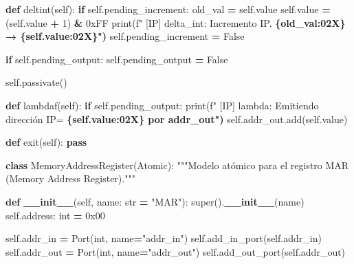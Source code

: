 \documentclass[12pt,oneside]{templates/unerthesis}
\newenvironment{Shaded}{\begin{snugshade}}{\end{snugshade}}
\newcommand{\BaseNTok}[1]{\textcolor[rgb]{0.00,0.00,0.81}{#1}}
\newcommand{\BuiltInTok}[1]{#1}
\newcommand{\ControlFlowTok}[1]{\textcolor[rgb]{0.13,0.29,0.53}{\textbf{#1}}}
\newcommand{\DecValTok}[1]{\textcolor[rgb]{0.00,0.00,0.81}{#1}}
\newcommand{\ErrorTok}[1]{\textcolor[rgb]{0.64,0.00,0.00}{\textbf{#1}}}
\newcommand{\FunctionTok}[1]{\textcolor[rgb]{0.13,0.29,0.53}{\textbf{#1}}}
\newcommand{\KeywordTok}[1]{\textcolor[rgb]{0.13,0.29,0.53}{\textbf{#1}}}
\newcommand{\NormalTok}[1]{#1}
\newcommand{\OperatorTok}[1]{\textcolor[rgb]{0.81,0.36,0.00}{\textbf{#1}}}
\newcommand{\SpecialStringTok}[1]{\textcolor[rgb]{0.31,0.60,0.02}{#1}}
\newcommand{\StringTok}[1]{\textcolor[rgb]{0.31,0.60,0.02}{#1}}
\newcommand{\VariableTok}[1]{\textcolor[rgb]{0.00,0.00,0.00}{#1}}
\begin{document}
\begin{Shaded}
\begin{Highlighting}[]
    \KeywordTok{def}\NormalTok{ deltint(}\VariableTok{self}\NormalTok{):}
        \ControlFlowTok{if} \VariableTok{self}\NormalTok{.pending\_increment:}
\NormalTok{            old\_val }\OperatorTok{=} \VariableTok{self}\NormalTok{.value}
            \VariableTok{self}\NormalTok{.value }\OperatorTok{=}\NormalTok{ (}\VariableTok{self}\NormalTok{.value }\OperatorTok{+} \DecValTok{1}\NormalTok{) }\OperatorTok{\&} \BaseNTok{0xFF}
            \BuiltInTok{print}\NormalTok{(}\SpecialStringTok{f"  [IP] delta\_int: Incremento IP.}
\ErrorTok{            \{old\_val:02X\} → \{self.value:02X\}")}
            \VariableTok{self}\NormalTok{.pending\_increment }\OperatorTok{=} \VariableTok{False}
        
        \ControlFlowTok{if} \VariableTok{self}\NormalTok{.pending\_output:}
            \VariableTok{self}\NormalTok{.pending\_output }\OperatorTok{=} \VariableTok{False}
        
        \VariableTok{self}\NormalTok{.passivate()}
    
    \KeywordTok{def}\NormalTok{ lambdaf(}\VariableTok{self}\NormalTok{):}
        \ControlFlowTok{if} \VariableTok{self}\NormalTok{.pending\_output:}
            \BuiltInTok{print}\NormalTok{(}\SpecialStringTok{f"  [IP] lambda: Emitiendo dirección IP=}
\ErrorTok{            \{self.value:02X\} por addr\_out")}
            \VariableTok{self}\NormalTok{.addr\_out.add(}\VariableTok{self}\NormalTok{.value)}
    
    \KeywordTok{def}\NormalTok{ exit(}\VariableTok{self}\NormalTok{):}
        \ControlFlowTok{pass}


\KeywordTok{class}\NormalTok{ MemoryAddressRegister(Atomic):}
    \StringTok{"""Modelo atómico para el registro MAR }
\StringTok{    (Memory Address Register)."""}
    
    \KeywordTok{def} \FunctionTok{\_\_init\_\_}\NormalTok{(}\VariableTok{self}\NormalTok{, name: }\BuiltInTok{str} \OperatorTok{=} \StringTok{"MAR"}\NormalTok{):}
        \BuiltInTok{super}\NormalTok{().}\FunctionTok{\_\_init\_\_}\NormalTok{(name)}
        \VariableTok{self}\NormalTok{.address: }\BuiltInTok{int} \OperatorTok{=} \BaseNTok{0x00}
        
        \VariableTok{self}\NormalTok{.addr\_in }\OperatorTok{=}\NormalTok{ Port(}\BuiltInTok{int}\NormalTok{, name}\OperatorTok{=}\StringTok{"addr\_in"}\NormalTok{)}
        \VariableTok{self}\NormalTok{.add\_in\_port(}\VariableTok{self}\NormalTok{.addr\_in)}
        \VariableTok{self}\NormalTok{.addr\_out }\OperatorTok{=}\NormalTok{ Port(}\BuiltInTok{int}\NormalTok{, name}\OperatorTok{=}\StringTok{"addr\_out"}\NormalTok{)}
        \VariableTok{self}\NormalTok{.add\_out\_port(}\VariableTok{self}\NormalTok{.addr\_out)}
        

\end{Highlighting}
\end{Shaded}
\end{document}
